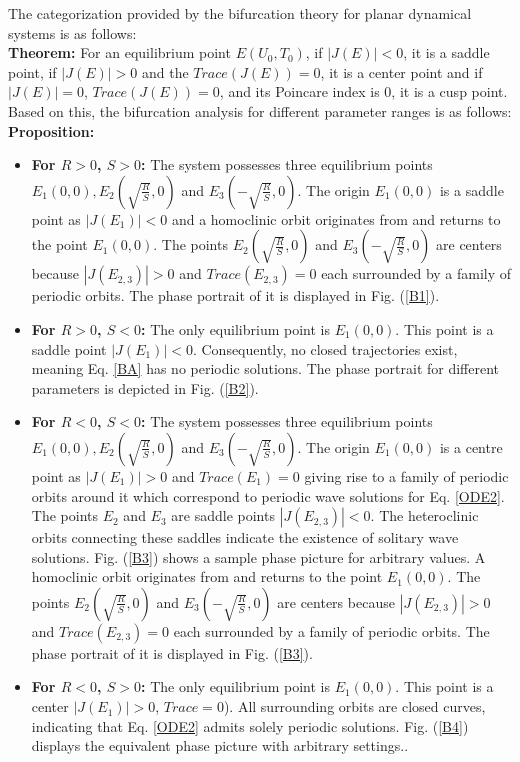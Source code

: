 \documentclass[10pt]{NSP1}
\numberwithin{equation}{section}
\begin{document}
\noindent
\newpage
The categorization provided by the bifurcation theory for planar dynamical systems is as follows:\\
\textbf{Theorem:} For an equilibrium point $E(U_{0}, T_{0})$, if $|J(E)| < 0$, it is a saddle point, if $|J(E)| > 0$ and the $Trace(J(E)) = 0$, it is a center point and if $|J(E)| = 0$, $Trace(J(E)) = 0$, and its Poincare index is $0$, it is a cusp point.\\
Based on this, the bifurcation analysis for different parameter ranges is as follows:\\
\textbf{Proposition:}
\begin{itemize}
  \item \textbf{For $R > 0$, $S > 0$:} The system possesses three equilibrium points $E_{1}(0, 0), E_{2}(\sqrt{\frac{R}{S}},0)$ and $E_{3}(-\sqrt{\frac{R}{S}}, 0)$. The origin $E_{1}(0, 0)$ is a saddle point as $|J(E_{1})| < 0$ and a homoclinic orbit originates from and returns to the point $E_{1}(0, 0)$. The points $E_{2}(\sqrt{\frac{R}{S}},0)$ and $E_{3}(-\sqrt{\frac{R}{S}}, 0)$ are centers because $|J(E_{2,3})| > 0$ and $Trace(E_{2,3})=0$ each surrounded by a family of periodic orbits. The phase portrait of it is displayed in Fig. (\ref{B1}).
  \item \textbf{For $R> 0$, $S < 0$:} The only equilibrium point is $E_{1}(0, 0)$. This point is a saddle point $|J(E_{1})| < 0$. Consequently, no closed trajectories exist, meaning Eq. \ref{BA} has no periodic solutions. The phase portrait for different parameters is depicted in Fig. (\ref{B2}).
  \item \textbf{For $R < 0$, $S < 0$:} The system possesses three equilibrium points $E_{1}(0, 0), E_{2}(\sqrt{\frac{R}{S}},0)$ and $E_{3}(-\sqrt{\frac{R}{S}}, 0)$. The origin $E_{1}(0, 0)$ is a centre point as $|J(E_{1})| > 0$ and $Trace(E_{1})=0$ giving rise to a family of periodic orbits around it which correspond to periodic wave solutions for Eq. \ref{ODE2}. The points $E_{2}$ and $E_{3}$ are saddle points $|J(E_{2,3})| < 0$. The heteroclinic orbits connecting these saddles indicate the existence of solitary wave solutions. Fig. (\ref{B3}) shows a sample phase picture for arbitrary values. A homoclinic orbit originates from and returns to the point $E_{1}(0, 0)$. The points $E_{2}(\sqrt{\frac{R}{S}},0)$ and $E_{3}(-\sqrt{\frac{R}{S}}, 0)$ are centers because $|J(E_{2,3})| > 0$ and $Trace(E_{2,3})=0$ each surrounded by a family of periodic orbits. The phase portrait of it is displayed in Fig. (\ref{B3}).
  \item \textbf{For $R < 0$, $S > 0$:} The only equilibrium point is $E_{1}(0, 0)$. This point is a center $|J(E_{1})| > 0$, $Trace=0$). All surrounding orbits are closed curves, indicating that Eq. \ref{ODE2} admits solely periodic solutions. Fig. (\ref{B4}) displays the equivalent phase picture with arbitrary settings..
\end{itemize}
\end{document}
